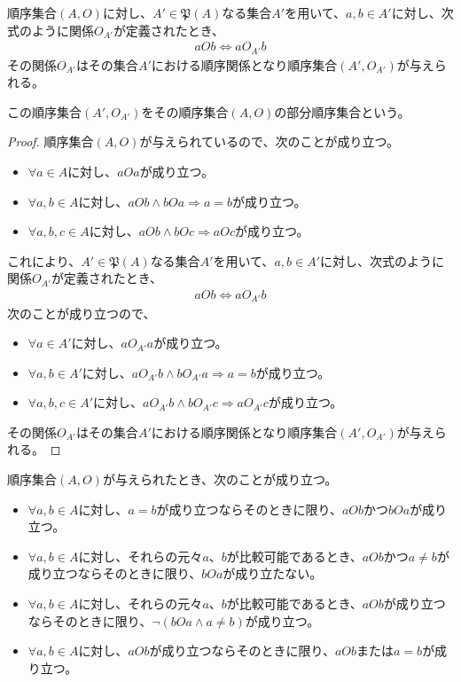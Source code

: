 \documentclass[dvipdfmx]{jsarticle}
\begin{document}
\begin{thm}\label{1.3.1.1}
順序集合$(A,O)$に対し、$A'\in \mathfrak{P}(A)$なる集合$A'$を用いて、$a,b \in A'$に対し、次式のように関係$O_{A'}$が定義されたとき、
\begin{align*}
aOb \Leftrightarrow aO_{A'}b
\end{align*}
その関係$O_{A'}$はその集合$A'$における順序関係となり順序集合$\left( A',O_{A'} \right)$が与えられる。
\end{thm}
\begin{dfn}
この順序集合$\left( A',O_{A'} \right)$をその順序集合$(A,O)$の部分順序集合という。
\end{dfn}
\begin{proof}
順序集合$(A,O)$が与えられているので、次のことが成り立つ。
\begin{itemize}
\item
  $\forall a \in A$に対し、$aOa$が成り立つ。
\item
  $\forall a,b \in A$に対し、$aOb \land bOa \Rightarrow a = b$が成り立つ。
\item
  $\forall a,b,c \in A$に対し、$aOb \land bOc \Rightarrow aOc$が成り立つ。
\end{itemize}
これにより、$A'\in \mathfrak{P}(A)$なる集合$A'$を用いて、$a,b \in A'$に対し、次式のように関係$O_{A'}$が定義されたとき、
\begin{align*}
aOb \Leftrightarrow aO_{A'}b
\end{align*}
次のことが成り立つので、
\begin{itemize}
\item
  $\forall a \in A'$に対し、$aO_{A'}a$が成り立つ。
\item
  $\forall a,b \in A'$に対し、$aO_{A'}b \land bO_{A'}a \Rightarrow a = b$が成り立つ。
\item
  $\forall a,b,c \in A'$に対し、$aO_{A'}b \land bO_{A'}c \Rightarrow aO_{A'}c$が成り立つ。
\end{itemize}
その関係$O_{A'}$はその集合$A'$における順序関係となり順序集合$\left( A',O_{A'} \right)$が与えられる。
\end{proof}
\begin{thm}\label{1.3.1.2}
順序集合$(A,O)$が与えられたとき、次のことが成り立つ。
\begin{itemize}
\item
  $\forall a,b \in A$に対し、$a = b$が成り立つならそのときに限り、$aOb$かつ$bOa$が成り立つ。
\item
  $\forall a,b \in A$に対し、それらの元々$a$、$b$が比較可能であるとき、$aOb$かつ$a \neq b$が成り立つならそのときに限り、$bOa$が成り立たない。
\item
  $\forall a,b \in A$に対し、それらの元々$a$、$b$が比較可能であるとき、$aOb$が成り立つならそのときに限り、$\neg(bOa \land a \neq b)$が成り立つ。
\item
  $\forall a,b \in A$に対し、$aOb$が成り立つならそのときに限り、$aOb$または$a = b$が成り立つ。
\end{itemize}
\end{thm}
\end{document}
